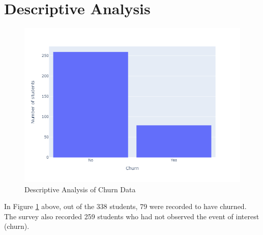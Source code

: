 \documentclass[doublespacing,12pt]{report}
\begin{document}
\section{Descriptive Analysis}
\begin{figure}[H]
    \centering
    \includegraphics[width=1\linewidth, height=0.5\textheight]{Figure 4/distribution.png}
    \caption{Descriptive Analysis of Churn Data}
    \label{fig: Descriptive Analysis}
\end{figure}
In Figure \ref{fig: Descriptive Analysis} above, out of the 338 students, 79 were recorded to have churned. The survey also recorded 259 students who had not observed the event of interest (churn).
\end{document}
